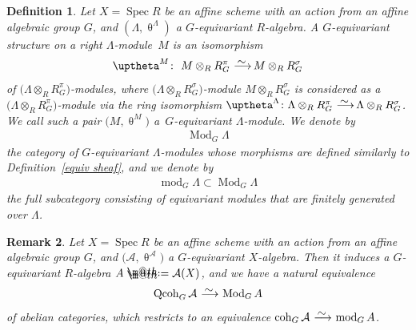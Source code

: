 \documentclass[10pt,a4paper]{amsart}
\makeatletter
\newtheorem{dfn}{Definition}[section]
\newtheorem{rem}[dfn]{Remark}
\newcommand*{\defeq}{\mathrel{\rlap{%
 \raisebox{0.3ex}{$\m@th\cdot$}}%
 \raisebox{-0.3ex}{$\m@th\cdot$}}%
 =}
\numberwithin{equation}{section}
\newcommand{\Spec}{\operatorname{Spec}}
\newcommand{\coh}{\operatorname{coh}}
\newcommand{\Qcoh}{\operatorname{Qcoh}}
\newcommand{\Mod}{\operatorname{Mod}}
\newcommand{\fmod}{\operatorname{mod}}
\newcommand{\cA}{\mathcal{A}}
\newcommand{\simto}{\,\,\,\,\raisebox{4pt}{$\sim$}{\kern -1.1em \longrightarrow}\,}
\makeatother
\begin{document}
\begin{dfn}%
Let $X=\Spec R$ be an affine scheme with an action from an affine algebraic group $G$, and $(\Lambda,\uptheta^{\Lambda})$ a $G$-equivariant $R$-algebra. A {\it $G$-equivariant structure} on a right $\Lambda$-module~$M$ is an isomorphism
\begin{gather*}
\uptheta^M\colon\ M\otimes_RR_G^{\pi}\simto M\otimes_RR_G^{\sigma}
\end{gather*}
of $\big(\Lambda\otimes_RR_G^{\pi}\big)$-modules, where $\big(\Lambda\otimes_RR_G^{\sigma}\big)$-module $M\otimes_RR_G^{\sigma}$ is considered as a $\big(\Lambda\otimes_RR_G^{\pi}\big)$-mo\-dule via the ring isomorphism $\uptheta^{\Lambda}\colon \Lambda\otimes_RR_G^{\pi}\simto\Lambda\otimes_RR_G^{\sigma}$. We call such a pair $\big(M,\uptheta^M\big)$ a~{\it $G$-equivariant $\Lambda$-module}. We denote by
\begin{gather*}
\Mod_G\Lambda
\end{gather*}
the category of $G$-equivariant $\Lambda$-modules whose morphisms are defined similarly to Definition~\ref{equiv sheaf}, and we denote by
\begin{gather*}
\fmod_G\Lambda\subset \Mod_G\Lambda
\end{gather*}
the full subcategory consisting of equivariant modules that are finitely generated over $\Lambda$.
\end{dfn}

\begin{rem}
Let $X=\Spec R$ be an affine scheme with an action from an affine algebraic group $G$, and $\big(\cA,\uptheta^{\cA}\big)$ a $G$-equivariant $X$-algebra. Then it induces a $G$-equivariant $R$-algebra $A\defeq\cA(X)$, and we have a natural equivalence
\begin{gather*}
\Qcoh_G\cA\simto\Mod_GA
\end{gather*}
of abelian categories, which restricts to an equivalence $\coh_G\cA\simto\fmod_GA$.
\end{rem}
\vspace{1mm}
\end{document}
